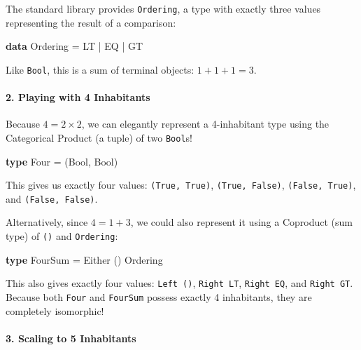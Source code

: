 \documentclass[
]{article}
\newenvironment{Shaded}{}{}
\newcommand{\DataTypeTok}[1]{\textcolor[rgb]{0.56,0.13,0.00}{#1}}
\newcommand{\KeywordTok}[1]{\textcolor[rgb]{0.00,0.44,0.13}{\textbf{#1}}}
\newcommand{\NormalTok}[1]{#1}
\newcommand{\OperatorTok}[1]{\textcolor[rgb]{0.40,0.40,0.40}{#1}}
\newcommand{\OtherTok}[1]{\textcolor[rgb]{0.00,0.44,0.13}{#1}}
\begin{document}
The standard library provides \texttt{Ordering}, a type with exactly
three values representing the result of a comparison:

\begin{Shaded}
\begin{Highlighting}[]
\KeywordTok{data} \DataTypeTok{Ordering} \OtherTok{=} \DataTypeTok{LT} \OperatorTok{|} \DataTypeTok{EQ} \OperatorTok{|} \DataTypeTok{GT}
\end{Highlighting}
\end{Shaded}

Like \texttt{Bool}, this is a sum of terminal objects:
\(1 + 1 + 1 = 3\).

\paragraph{2. Playing with 4
Inhabitants}\label{playing-with-4-inhabitants}

Because \(4 = 2 \times 2\), we can elegantly represent a 4-inhabitant
type using the Categorical Product (a tuple) of two \texttt{Bool}s!

\begin{Shaded}
\begin{Highlighting}[]
\KeywordTok{type} \DataTypeTok{Four} \OtherTok{=}\NormalTok{ (}\DataTypeTok{Bool}\NormalTok{, }\DataTypeTok{Bool}\NormalTok{)}
\end{Highlighting}
\end{Shaded}

This gives us exactly four values: \texttt{(True,\ True)},
\texttt{(True,\ False)}, \texttt{(False,\ True)}, and
\texttt{(False,\ False)}.

Alternatively, since \(4 = 1 + 3\), we could also represent it using a
Coproduct (sum type) of \texttt{()} and \texttt{Ordering}:

\begin{Shaded}
\begin{Highlighting}[]
\KeywordTok{type} \DataTypeTok{FourSum} \OtherTok{=} \DataTypeTok{Either}\NormalTok{ () }\DataTypeTok{Ordering}
\end{Highlighting}
\end{Shaded}

This also gives exactly four values: \texttt{Left\ ()},
\texttt{Right\ LT}, \texttt{Right\ EQ}, and \texttt{Right\ GT}. Because
both \texttt{Four} and \texttt{FourSum} possess exactly 4 inhabitants,
they are completely isomorphic!

\paragraph{3. Scaling to 5 Inhabitants}\label{scaling-to-5-inhabitants}
\end{document}
